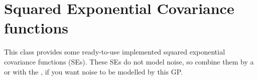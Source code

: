 \documentclass[letterpaper,10pt,english]{sphinxmanual}
\begin{document}
\label{covars:module-pygp.covar.se}

\section{Squared Exponential Covariance functions}
\label{covars:squared-exponential-covariance-functions}
This class provides some ready-to-use implemented squared exponential covariance functions (SEs).
These SEs do not model noise, so combine them by a {\hyperref[covars:pygp.covar.combinators.SumCF]{}}
or {\hyperref[covars:pygp.covar.combinators.ProductCF]{}} with the , if you want noise to be modelled by this GP.
\end{document}
